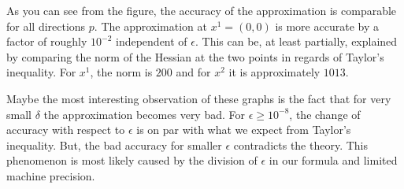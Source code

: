 \documentclass{article}
\begin{document}
As you can see from the figure, the accuracy of the approximation is comparable
for all directions $p$. The approximation at $x^1=(0,0)$ is more accurate by a factor of  roughly $10^{-2}$ independent of $\epsilon$. This can be, at least partially, explained by comparing the norm of the Hessian at the two points in regards of Taylor's inequality. For $x^1$, the norm is $200$ and for $x^2$ it is approximately $1013$. \par
Maybe the most interesting observation of these graphs is the fact that for very small $\delta$
the approximation becomes very bad. For $\epsilon \geq 10^{-8}$, the change of accuracy with respect to $\epsilon$ is on par with what we expect from Taylor's inequality. But, the bad accuracy for smaller $\epsilon$ contradicts the theory. This phenomenon is most likely caused by the division of $\epsilon$ in our formula and limited machine precision.
\end{document}
